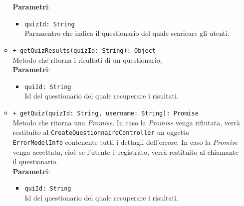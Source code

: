\begin{itemize}
\begin{itemize}
	\textbf{Parametri}:
	\begin{itemize}
		\item \texttt{quizId: String} \\ Paramentro che indica il questionario del quale scaricare gli utenti.
	\end{itemize}
	\item \texttt{+ getQuizResults(quizId: String): Object} \\ Metodo che ritorna i risultati di un questionario; \\
	\textbf{Parametri}:
	\begin{itemize}
		\item \texttt{quiId: String} \\ Id del questionario del quale recuperare i risultati.
	\end{itemize}
	\item \texttt{+ getQuiz(quizId: String, username: String): Promise} \\ Metodo che ritorna una \textit{Promise}. In caso la \textit{Promise} venga rifiutata, verrà restituito al \texttt{CreateQuestionnaireController} un oggetto \texttt{ErrorModelInfo} contenente tutti i dettagli dell'errore. In caso la \textit{Promise} venga accettata, cioè se l'utente è registrato, verrà restituito al chiamante il questionario. \\
	\textbf{Parametri}:
	\begin{itemize}
		\item \texttt{quiId: String} \\ Id del questionario del quale recuperare i risultati.
	\end{itemize}
\end{itemize}
\end{itemize}